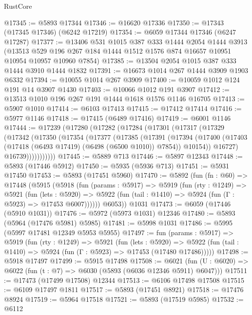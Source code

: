 \begin{lexlean}{RustCore}
\begin{coremodule}
@17345 := @5893 @17344
@17346 := @16620 @17336
@17350 := @17343 (@17345 @17346) (@6242 @17219)
@17354 := @6059 @17344 @17346 (@6247 @17287)
@17377 := @13406
    @531
    @1015
    @387
    @333
    @1444
    @2054
    @1444
    @3913
    (@13513 @529 @196 @267 @184 @1444 @1512 @1576 @874 @16657 @10951 @10954 @10957 @10960 @7854)
@17385 := @13504 @2054 @1015 @387 @333 @1444 @3910 @1444 @1832
@17391 := @16673 @1014 @267 @1444 @3909 @1903 @6332
@17394 := @10055 @1014 @267 @3909
@17400 := @10059 @1012 @124 @191 @14 @3907 @1430
@17403 := @10066 @1012 @191 @3907
@17412 := @13513 @1010 @196 @267 @191 @1444 @1618 @1576 @1146 @16705
@17413 := @5907 @1010
@17414 := @6103 @17413
@17415 := @17412 @17414
@17416 := @5977 @1146
@17418 := @17415 (@6489 @17416)
@17419 := @6001 @1146
@17444 := @17239
    (@17280
      (@17282
        (@17284
          (@17301
            (@17317
              (@17329
                (@17342
                  (@17350
                    (@17354
                      (@17377
                        (@17385
                          (@17391
                            (@17394
                              (@17400
                                (@17403 (@17418 (@6493 @17419) (@6498 (@6500 @1010)) @7854))
                                @10154))
                            @16727)
                          @16739)))))))))))
@17445 := @5889 @713
@17446 := @5897 @12343
@17448 := @5893 (@17446 @5912)
@17450 := @5935 (@5936 @713)
@17451 := @5931 @17450
@17453 := @5893 (@17451 @5960)
@17470 := @5892
    (fun (fn : @60) =>
    @17448
      (@5915
        (@5918
          (fun (params : @5917) =>
          @5919
            (fun (rty : @1249) =>
            @5921
              (fun (lets : @5920) =>
              @5922 (fun (tail : @1410) => @5924 (fun (Γ : @5923) => @17453 @6007))))))
        @6053))
    @1031
@17473 := @6059 (@17446 (@5910 @1031))
@17476 := @5972 (@5973 @1031) @12346
@17480 := @5893 (@5964 (@17476 @5981) @5985)
@17481 := @5998 @1031
@17486 := @5995 (@5997 @17481 @12349 @5953 @5955)
@17497 := fun (params : @5917) =>
  @5919
    (fun (rty : @1249) =>
    @5921
      (fun (lets : @5920) =>
      @5922 (fun (tail : @1410) => @5924 (fun (Γ : @5923) => @17453 (@17480 @17486)))))
@17498 := @5918 @17497
@17499 := @5915 @17498
@17508 := @6021
    (fun (U : @6020) => @6022 (fun (t : @7) => @6030 (@5893 (@6036 @12346 @5911) @6047)))
@17511 := @17473 (@17499 @17508) @12344
@17513 := @6106 @17498 @17508
@17515 := @6109 @17497 @1811
@17517 := @5893 (@17451 @8921)
@17518 := @17476 @8924
@17519 := @5964 @17518
@17521 := @5893 (@17519 @5985)
@17532 := @6112

\end{coremodule}
\end{lexlean}
